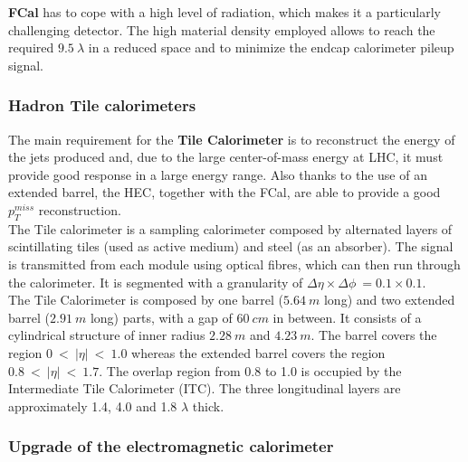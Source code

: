 \documentclass[a4paper,twoside,12pt]{article}
\begin{document}
\textbf{FCal} has to cope with a high level of radiation, which makes it a particularly challenging detector.  The high material density employed allows to reach the required $9.5\ \lambda$ in a reduced space and to minimize the endcap calorimeter pileup signal.  \\

\subsubsection*{Hadron Tile calorimeters}
The main requirement for the \textbf{Tile Calorimeter} is to reconstruct the energy of the jets produced and, due to the large center-of-mass energy at LHC, it must provide
good response in a large energy range. Also thanks to the use of an extended barrel, the HEC, together with the FCal, are able to provide a good $p_T^{miss}$ reconstruction.\\

The Tile calorimeter is a sampling calorimeter composed by alternated layers of scintillating tiles (used as active medium) and steel (as an absorber). The signal is transmitted from each module using optical fibres, which can then run through the calorimeter. It is segmented with a granularity of
$\Delta\eta \times \Delta\phi\ = 0.1 \times 0.1$.\\
The Tile Calorimeter is composed by one barrel ($5.64\ m$ long) and two extended barrel ($2.91\ m$ long) parts, with a gap of $60\ cm$ in between. It consists of a cylindrical structure of inner radius $2.28\ m$ and $4.23\ m$. The barrel covers the region $0\ <\ |\eta|\ <\ 1.0$ whereas the extended barrel covers the region $0.8\ <\ |\eta|\ <\ 1.7$. The overlap region from 0.8 to 1.0 is
occupied by the Intermediate Tile Calorimeter (ITC). The three longitudinal layers are approximately 1.4, 4.0 and 1.8 $\lambda$ thick. \\

\subsubsection*{Upgrade of the electromagnetic calorimeter}
\end{document}
